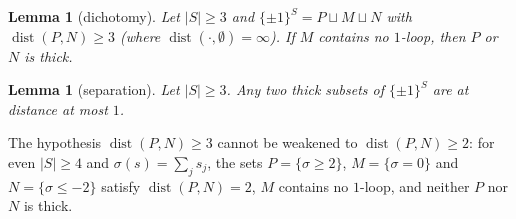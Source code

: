 \documentclass[11pt,letterpaper]{article}
\newtheorem{lemma}[theorem]{Lemma}
\theoremstyle{definition}
\newcommand{\cube}[1]{\{\pm1\}^{#1}}
\DeclareMathOperator{\dist}{dist}
\begin{document}
\begin{lemma}[dichotomy]\label{lem:dichotomy}
Let $|S|\ge3$ and $\cube S=P\sqcup M\sqcup N$ with $\dist(P,N)\ge3$ (where
$\dist(\cdot,\emptyset)=\infty$). If $M$ contains no $1$-loop, then $P$ or $N$ is thick.
\end{lemma}

\begin{lemma}[separation]\label{lem:thicksep}
Let $|S|\ge3$. Any two thick subsets of $\cube S$ are at distance at most $1$.
\end{lemma}

The hypothesis $\dist(P,N)\ge3$ cannot be weakened to $\dist(P,N)\ge2$: for even $|S|\ge4$ and
$\sigma(s)=\sum_js_j$, the sets $P=\{\sigma\ge2\}$, $M=\{\sigma=0\}$ and $N=\{\sigma\le-2\}$ satisfy
$\dist(P,N)=2$, $M$ contains no $1$-loop, and neither $P$ nor $N$ is thick.
\end{document}
